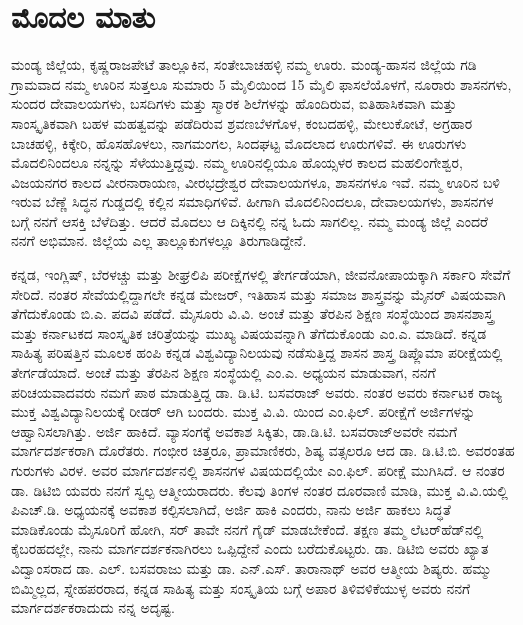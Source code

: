 
\chapter*{ಮೊದಲ ಮಾತು}

ಮಂಡ್ಯ ಜಿಲ್ಲೆಯ, ಕೃಷ್ಣರಾಜಪೇಟೆ ತಾಲ್ಲೂಕಿನ, ಸಂತೇಬಾಚಹಳ್ಳಿ ನಮ್ಮ ಊರು. ಮಂಡ್ಯ-ಹಾಸನ ಜಿಲ್ಲೆಯ ಗಡಿ ಗ್ರಾಮವಾದ ನಮ್ಮ ಊರಿನ ಸುತ್ತಲೂ ಸುಮಾರು 5 ಮೈಲಿಯಿಂದ 15 ಮೈಲಿ ಫಾಸಲೆಯೊಳಗೆ, ನೂರಾರು ಶಾಸನಗಳು, ಸುಂದರ ದೇವಾಲಯಗಳು, ಬಸದಿಗಳು ಮತ್ತು ಸ್ಮಾರಕ ಶಿಲೆಗಳನ್ನು ಹೊಂದಿರುವ, ಐತಿಹಾಸಿಕವಾಗಿ ಮತ್ತು ಸಾಂಸ್ಕೃತಿಕವಾಗಿ ಬಹಳ ಮಹತ್ವವನ್ನು ಪಡೆದಿರುವ ಶ್ರವಣಬೆಳಗೊಳ, ಕಂಬದಹಳ್ಳಿ, ಮೇಲುಕೋಟೆ, ಅಗ್ರಹಾರ ಬಾಚಹಳ್ಳಿ, ಕಿಕ್ಕೇರಿ, ಹೊಸಹೊಳಲು, ನಾಗಮಂಗಲ, ಸಿಂದಘಟ್ಟ ಮೊದಲಾದ ಊರುಗಳಿವೆ. ಈ ಊರುಗಳು ಮೊದಲಿನಿಂದಲೂ ನನ್ನನ್ನು ಸೆಳೆಯುತ್ತಿದ್ದವು. ನಮ್ಮ ಊರಿನಲ್ಲಿಯೂ ಹೊಯ್ಸಳರ ಕಾಲದ ಮಹಲಿಂಗೇಶ್ವರ, ವಿಜಯನಗರ ಕಾಲದ ವೀರನಾರಾಯಣ, ವೀರಭದ್ರೇಶ್ವರ ದೇವಾಲಯಗಳೂ, ಶಾಸನಗಳೂ ಇವೆ. ನಮ್ಮ ಊರಿನ ಬಳಿ ಇರುವ ಬೆಣ್ಣೆ ಸಿದ್ಧನ ಗುಡ್ಡದಲ್ಲಿ ಕಲ್ಲಿನ ಸಮಾಧಿಗಳಿವೆ. ಹೀಗಾಗಿ ಮೊದಲಿನಿಂದಲೂ, ದೇವಾಲಯಗಳು, ಶಾಸನಗಳ ಬಗ್ಗೆ ನನಗೆ ಆಸಕ್ತಿ ಬೆಳೆದಿತ್ತು. ಆದರೆ ಮೊದಲು ಆ ದಿಕ್ಕಿನಲ್ಲಿ ನನ್ನ ಓದು ಸಾಗಲಿಲ್ಲ. ನಮ್ಮ ಮಂಡ್ಯ ಜಿಲ್ಲೆ ಎಂದರೆ ನನಗೆ ಅಭಿಮಾನ. ಜಿಲ್ಲೆಯ ಎಲ್ಲ ತಾಲ್ಲೂಕುಗಳಲ್ಲೂ ತಿರುಗಾಡಿದ್ದೇನೆ.

ಕನ್ನಡ, ಇಂಗ್ಲಿಷ್​, ಬೆರಳಚ್ಚು ಮತ್ತು ಶೀಘ್ರಲಿಪಿ ಪರೀಕ್ಷೆಗಳಲ್ಲಿ ತೇರ್ಗಡೆಯಾಗಿ, ಜೀವನೋಪಾಯಕ್ಕಾಗಿ ಸರ್ಕಾರಿ ಸೇವೆಗೆ ಸೇರಿದೆ. ನಂತರ ಸೇವೆಯಲ್ಲಿದ್ದಾಗಲೇ ಕನ್ನಡ ಮೇಜರ್​, ಇತಿಹಾಸ ಮತ್ತು ಸಮಾಜ ಶಾಸ್ತ್ರವನ್ನು ಮೈನರ್​ ವಿಷಯವಾಗಿ ತೆಗೆದುಕೊಂಡು ಬಿ.ಎ. ಪದವಿ ಪಡೆದೆ. ಮೈಸೂರು ವಿ.ವಿ. ಅಂಚೆ ಮತ್ತು ತೆರಪಿನ ಶಿಕ್ಷಣ ಸಂಸ್ಥೆಯಿಂದ ಶಾಸನಶಾಸ್ತ್ರ ಮತ್ತು ಕರ್ನಾಟಕದ ಸಾಂಸ್ಕೃತಿಕ ಚರಿತ್ರೆಯನ್ನು ಮುಖ್ಯ ವಿಷಯವನ್ನಾಗಿ ತೆಗೆದುಕೊಂಡು ಎಂ.ಎ. ಮಾಡಿದೆ. ಕನ್ನಡ ಸಾಹಿತ್ಯ ಪರಿಷತ್ತಿನ ಮೂಲಕ ಹಂಪಿ ಕನ್ನಡ ವಿಶ್ವವಿದ್ಯಾನಿಲಯವು ನಡೆಸುತ್ತಿದ್ದ ಶಾಸನ ಶಾಸ್ತ್ರ ಡಿಪ್ಲೊಮಾ ಪರೀಕ್ಷೆಯಲ್ಲಿ ತೇರ್ಗಡೆಯಾದೆ. ಅಂಚೆ ಮತ್ತು ತೆರಪಿನ ಶಿಕ್ಷಣ ಸಂಸ್ಥೆಯಲ್ಲಿ ಎಂ.ಎ. ಅಧ್ಯಯನ ಮಾಡುವಾಗ, ನನಗೆ ಪರಿಚಯವಾದವರು ನಮಗೆ ಪಾಠ ಮಾಡುತ್ತಿದ್ದ ಡಾ. ಡಿ.ಟಿ. ಬಸವರಾಜ್​ ಅವರು. ನಂತರ ಅವರು ಕರ್ನಾಟಕ ರಾಜ್ಯ ಮುಕ್ತ ವಿಶ್ವವಿದ್ಯಾನಿಲಯಕ್ಕೆ ರೀಡರ್​ ಆಗಿ ಬಂದರು. ಮುಕ್ತ ವಿ.ವಿ. ಯಿಂದ ಎಂ.ಫಿಲ್​. ಪರೀಕ್ಷೆಗೆ ಅರ್ಜಿಗಳನ್ನು ಆಹ್ವಾನಿಸಲಾಗಿತ್ತು. ಅರ್ಜಿ ಹಾಕಿದೆ. ವ್ಯಾಸಂಗಕ್ಕೆ ಅವಕಾಶ ಸಿಕ್ಕಿತು, ಡಾ.ಡಿ.ಟಿ. ಬಸವರಾಜ್​ ಅವರೇ ನಮಗೆ ಮಾರ್ಗದರ್ಶಕರಾಗಿ ದೊರೆತರು. ಗಂಭೀರ ಚಿತ್ತರೂ, ಪ್ರಾಮಾಣಿಕರು, ಶಿಷ್ಯ ವತ್ಸಲರೂ ಆದ ಡಾ. ಡಿ.ಟಿ.ಬಿ. ಅವರಂತಹ ಗುರುಗಳು ವಿರಳ. ಅವರ ಮಾರ್ಗದರ್ಶನಲ್ಲಿ ಶಾಸನಗಳ ವಿಷಯದಲ್ಲಿಯೇ ಎಂ.ಫಿಲ್​. ಪರೀಕ್ಷೆ ಮುಗಿಸಿದೆ. ಆ ನಂತರ ಡಾ. ಡಿಟಿಬಿ ಯವರು ನನಗೆ ಸ್ವಲ್ಪ ಆತ್ಮೀಯರಾದರು. ಕೆಲವು ತಿಂಗಳ ನಂತರ ದೂರವಾಣಿ ಮಾಡಿ, ಮುಕ್ತ ವಿ.ವಿ.ಯಲ್ಲಿ ಪಿಎಚ್​.ಡಿ. ಅಧ್ಯಯನಕ್ಕೆ ಅವಕಾಶ ಕಲ್ಪಿಸಲಾಗಿದೆ, ಅರ್ಜಿ ಹಾಕಿ ಎಂದರು, ನಾನು ಅರ್ಜಿ ಹಾಕಲು ಸಿದ್ಧತೆ ಮಾಡಿಕೊಂಡು ಮೈಸೂರಿಗೆ ಹೋಗಿ, ಸರ್​ ತಾವೇ ನನಗೆ ಗೈಡ್​ ಮಾಡಬೇಕೆಂದೆ. ತಕ್ಷಣ ತಮ್ಮ ಲೆಟರ್​ಹೆಡ್​ನಲ್ಲಿ ಕೈಬರಹದಲ್ಲೇ, ನಾನು ಮಾರ್ಗದರ್ಶಕನಾಗಿರಲು ಒಪ್ಪಿದ್ದೇನೆ ಎಂದು ಬರೆದುಕೊಟ್ಟರು. ಡಾ. ಡಿಟಿಬಿ ಅವರು ಖ್ಯಾತ ವಿದ್ವಾಂಸರಾದ ಡಾ. ಎಲ್​. ಬಸವರಾಜು ಮತ್ತು ಡಾ. ಎನ್​.ಎಸ್​. ತಾರಾನಾಥ್​ ಅವರ ಆತ್ಮೀಯ ಶಿಷ್ಯರು. ಹಮ್ಮು ಬಿಮ್ಮಿಲ್ಲದ, ಸ್ನೇಹಪರರಾದ, ಕನ್ನಡ ಸಾಹಿತ್ಯ ಮತ್ತು ಸಂಸ್ಕೃತಿಯ ಬಗ್ಗೆ ಅಪಾರ ತಿಳಿವಳಿಕೆಯುಳ್ಳ ಅವರು ನನಗೆ ಮಾರ್ಗದರ್ಶಕರಾದುದು ನನ್ನ ಅದೃಷ್ಟ.

